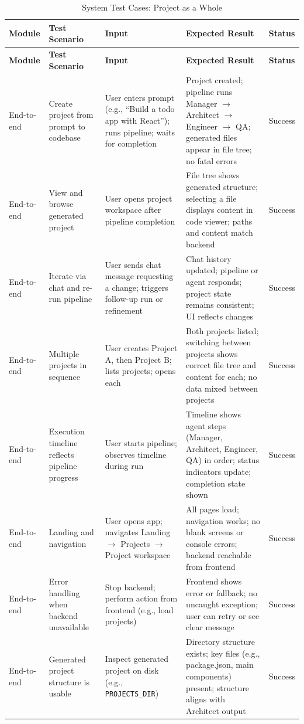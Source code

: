 \renewcommand{\arraystretch}{1.2}
\begin{longtable}{|p{2.8cm}|p{3.4cm}|p{3.4cm}|p{4.2cm}|>{\centering\arraybackslash}p{1.6cm}|}
\caption{System Test Cases: Project as a Whole}
\label{tab:system_tests}
\\
\hline
\textbf{Module} & \textbf{Test Scenario} & \textbf{Input} & \textbf{Expected Result} & \textbf{Status} \\
\hline
\endfirsthead
\hline
\textbf{Module} & \textbf{Test Scenario} & \textbf{Input} & \textbf{Expected Result} & \textbf{Status} \\
\hline
\endhead
\hline
\endfoot
\hline
\endlastfoot
End-to-end & Create project from prompt to codebase & User enters prompt (e.g., ``Build a todo app with React''); runs pipeline; waits for completion & Project created; pipeline runs Manager $\rightarrow$ Architect $\rightarrow$ Engineer $\rightarrow$ QA; generated files appear in file tree; no fatal errors & Success \\
\hline
End-to-end & View and browse generated project & User opens project workspace after pipeline completion & File tree shows generated structure; selecting a file displays content in code viewer; paths and content match backend & Success \\
\hline
End-to-end & Iterate via chat and re-run pipeline & User sends chat message requesting a change; triggers follow-up run or refinement & Chat history updated; pipeline or agent responds; project state remains consistent; UI reflects changes & Success \\
\hline
End-to-end & Multiple projects in sequence & User creates Project A, then Project B; lists projects; opens each & Both projects listed; switching between projects shows correct file tree and content for each; no data mixed between projects & Success \\
\hline
End-to-end & Execution timeline reflects pipeline progress & User starts pipeline; observes timeline during run & Timeline shows agent steps (Manager, Architect, Engineer, QA) in order; status indicators update; completion state shown & Success \\
\hline
End-to-end & Landing and navigation & User opens app; navigates Landing $\rightarrow$ Projects $\rightarrow$ Project workspace & All pages load; navigation works; no blank screens or console errors; backend reachable from frontend & Success \\
\hline
End-to-end & Error handling when backend unavailable & Stop backend; perform action from frontend (e.g., load projects) & Frontend shows error or fallback; no uncaught exception; user can retry or see clear message & Success \\
\hline
End-to-end & Generated project structure is usable & Inspect generated project on disk (e.g., \texttt{PROJECTS\_\allowbreak{}DIR}) & Directory structure exists; key files (e.g., package.json, main components) present; structure aligns with Architect output & Success \\
\hline
\end{longtable}

